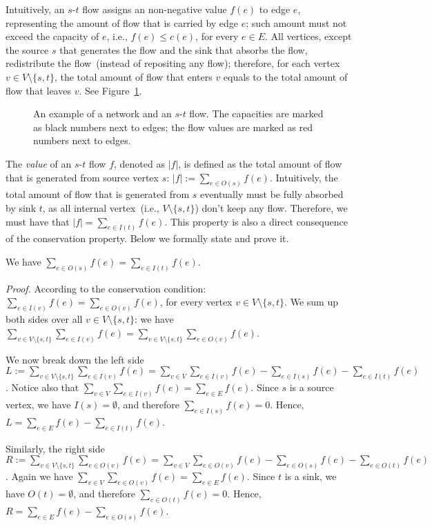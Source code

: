 Intuitively, an $s$-$t$ flow assigns an non-negative value $f(e)$ to edge $e$, representing the
amount of flow that is carried by edge $e$; such amount must not exceed the capacity of $e$, i.e., $f(e) \le c(e)$, for every $e\in E$.
All vertices, except the source $s$ that generates the flow and the sink that absorbs the flow,
redistribute the flow~(instead of repositing any flow); therefore, for each vertex $v\in V\setminus\{s,t\}$,
the total amount of flow that enters $v$ equals to the total amount of flow that leaves $v$.
See Figure~\ref{fig:flow}.

\begin{figure}[h]
\centering{}
\caption{An example of a network and an $s$-$t$ flow.
The capacities are marked as black numbers next to edges;
the flow values are marked as red numbers next to edges.}
\label{fig:flow}
\end{figure}

The \emph{value} of an $s$-$t$ flow $f$, denoted as $|f|$,
is defined as the total amount of flow that is generated from source vertex $s$:
$|f| := \sum_{e\in O(s)} f(e)$. Intuitively, the total amount of flow that is generated
from $s$ eventually must be fully absorbed by sink $t$, as all internal vertex~(i.e., $V\setminus\{s,t\}$)
don't keep any flow. Therefore, we must have that 
$|f| = \sum_{e\in I(t)} f(e)$.  
This property is also a direct consequence of the conservation property.
Below we formally state and prove it.

\begin{fact}
We have $\sum_{e\in O(s)} f(e) = \sum_{e\in I(t)} f(e)$. 
\end{fact}

\emph{Proof.} According to the conservation condition:
$\sum_{e\in I(v)} f(e) = \sum_{e\in O(v)} f(e)$, 
for every vertex $v\in V\setminus\{s,t\}$. 
We sum up both sides over all $v\in V\setminus\{s,t\}$: 
we have $\sum_{v\in V\setminus\{s,t\}} \sum_{e\in I(v)} f(e) = \sum_{v\in V\setminus\{s,t\}} \sum_{e\in O(v)} f(e)$. 

We now break down the left side 
$L := \sum_{v\in V\setminus\{s,t\}} \sum_{e\in I(v)} f(e) 
= \sum_{v\in V} \sum_{e\in I(v)} f(e) -  \sum_{e\in I(s)} f(e) - \sum_{e\in I(t)} f(e)$.
Notice also that $\sum_{v\in V} \sum_{e\in I(v)} f(e) = \sum_{e\in E} f(e)$.
Since $s$ is a source vertex, we have $I(s) = \emptyset$, and therefore $\sum_{e\in I(s)} f(e)  = 0$.
Hence, $L = \sum_{e\in E} f(e) - \sum_{e\in I(t)} f(e)$.

Similarly, the right side 
$R := \sum_{v\in V\setminus\{s,t\}} \sum_{e\in O(v)} f(e) 
= \sum_{v\in V} \sum_{e\in O(v)} f(e) -  \sum_{e\in O(s)} f(e) - \sum_{e\in O(t)} f(e)$.
Again we have $\sum_{v\in V} \sum_{e\in O(v)} f(e) = \sum_{e\in E} f(e)$.
Since $t$ is a sink, we have $O(t) = \emptyset$, and therefore $\sum_{e\in O(t)} f(e)  = 0$.
Hence, $R = \sum_{e\in E} f(e) - \sum_{e\in O(s)} f(e)$.

